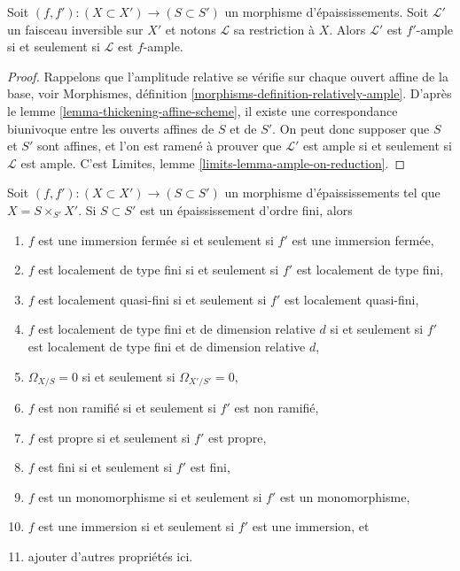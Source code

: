 \begin{lemma}
\label{lemma-thicken-property-relatively-ample}
Soit $(f, f') : (X \subset X') \to (S \subset S')$ un morphisme
d'épaississements. Soit $\mathcal{L}'$ un faisceau inversible sur $X'$
et notons $\mathcal{L}$ sa restriction à $X$.
Alors $\mathcal{L}'$ est $f'$-ample si et seulement si
$\mathcal{L}$ est $f$-ample.
\end{lemma}

\begin{proof}
Rappelons que l'amplitude relative se vérifie sur chaque
ouvert affine de la base, voir
Morphismes, définition \ref{morphisms-definition-relatively-ample}.
D'après le lemme \ref{lemma-thickening-affine-scheme},
il existe une correspondance biunivoque entre
les ouverts affines de $S$ et de $S'$.
On peut donc supposer que $S$ et $S'$ sont affines,
et l'on est ramené à prouver que
$\mathcal{L}'$ est ample si et seulement si
$\mathcal{L}$ est ample.
C'est Limites, lemme \ref{limits-lemma-ample-on-reduction}.
\end{proof}

\begin{lemma}
\label{lemma-thicken-property-morphisms-cartesian}
Soit $(f, f') : (X \subset X') \to (S \subset S')$ un morphisme
d'épaississements tel que $X = S \times_{S'} X'$. Si $S \subset S'$
est un épaississement d'ordre fini, alors
\begin{enumerate}
\item $f$ est une immersion fermée si et seulement si $f'$ est une immersion fermée,
\item $f$ est localement de type fini si et seulement si $f'$ est
localement de type fini,
\item $f$ est localement quasi-fini si et seulement si $f'$ est localement
quasi-fini,
\item $f$ est localement de type fini et de dimension relative $d$ si et
seulement si $f'$ est localement de type fini et de dimension relative $d$,
\item $\Omega_{X/S} = 0$ si et seulement si $\Omega_{X'/S'} = 0$,
\item $f$ est non ramifié si et seulement si $f'$ est non ramifié,
\item $f$ est propre si et seulement si $f'$ est propre,
\item $f$ est fini si et seulement si $f'$ est fini,
\item $f$ est un monomorphisme si et seulement si $f'$ est un monomorphisme,
\item $f$ est une immersion si et seulement si $f'$ est une immersion, et
\item ajouter d'autres propriétés ici.
\end{enumerate}
\end{lemma}

